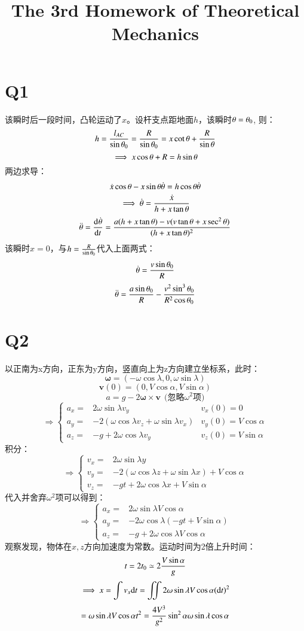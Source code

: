 \documentclass[UTF8,9pt]{ctexart}
\title{The 3rd Homework of Theoretical Mechanics}
\begin{document}
 
    \maketitle 
    \section{Q1}
        该瞬时后一段时间，凸轮运动了$x$。设杆支点距地面$h$，该瞬时$\theta=\theta_0$, 则：
        $$h=\frac{l_{AC}}{\sin\theta_0}=\frac{R}{\sin\theta_0}=x\cot\theta+\frac{R}{\sin\theta}$$
        $$\implies x\cos\theta+R=h\sin\theta$$
        两边求导：
        $$\dot{x}\cos\theta-x\sin\theta\dot{\theta}=h\cos\theta\dot{\theta}$$
        $$\implies \dot{\theta}=\frac{\dot{x}}{h+x\tan\theta}$$ 
        $$\ddot{\theta}=\frac{\mathrm{d}^{} \dot{\theta}}{\mathrm{d} t^{}}=\frac{a(h+x\tan\theta)-v(v\tan\theta+x\sec^2\theta)}{(h+x\tan\theta)^2}$$
        该瞬时$x=0$，与$h=\frac{R}{\sin\theta_0}$代入上面两式：
        $$\dot{\theta}=\frac{v\sin\theta_0}{R}$$
        $$\ddot{\theta}=\frac{a\sin\theta_0}{R}-\frac{v^2\sin^3\theta_0}{R^2\cos\theta_0}$$
    \section{Q2} 
        以正南为x方向，正东为y方向，竖直向上为z方向建立坐标系，此时：
        $$\bm{\omega}=(-\omega\cos\lambda,0,\omega\sin\lambda)$$
        $$\bm{v}(0)=(0,V\cos\alpha,V\sin\alpha)$$
        $$a=g-2 \bm{\omega} \times \bm{v} \ \ \text{(忽略}\omega^2\text{项)}$$
        $$\Rightarrow \left\{\begin{array}{rll}
            a_x=&2\omega\sin\lambda v_y & v_x(0)=0\\ 
            a_y=&-2(\omega\cos\lambda v_z+\omega\sin\lambda v_x)&v_y(0)=V\cos\alpha\\
            a_z=&-g+2\omega\cos\lambda v_y &v_z(0)=V\sin\alpha
        \end{array}\right.$$
        积分：
        $$\Rightarrow \left\{\begin{array}{rl}
            v_x=&2\omega\sin\lambda y \\ 
            v_y=&-2(\omega\cos\lambda z+\omega\sin\lambda x)+V\cos\alpha\\
            v_z=&-gt+2\omega\cos\lambda x +V\sin\alpha
        \end{array}\right.$$
        代入并舍弃$\omega^2$项可以得到：
        $$\Rightarrow \left\{\begin{array}{rll}
            a_x=&2\omega\sin\lambda V\cos\alpha\\ 
            a_y=&-2\omega\cos\lambda (-gt +V\sin\alpha)\\
            a_z=&-g+2\omega\cos\lambda V\cos\alpha
        \end{array}\right.$$
        观察发现，物体在$x,z$方向加速度为常数。运动时间为2倍上升时间：
        $$t=2t_0 \simeq 2\frac{V\sin\alpha}{g}$$
        $$\implies x=\int v_x \mathrm{d} t=\iint 2\omega\sin\lambda V\cos\alpha (\mathrm{d} t)^2$$
        $$=\omega\sin\lambda V\cos\alpha t^2=\frac{4V^3}{g^2}\sin^2\alpha\omega\sin\lambda\cos\alpha$$
\end{document}
